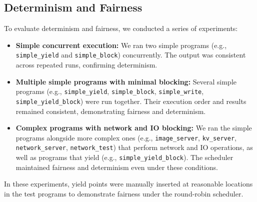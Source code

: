 \documentclass[10pt,a4paper,twocolumn]{IEEEtran}
\begin{document}
\subsection{Determinism and Fairness}
To evaluate determinism and fairness, we conducted a series of experiments:
\begin{itemize}
    \item \textbf{Simple concurrent execution:} We ran two simple programs (e.g., \texttt{simple\_yield} and \texttt{simple\_block}) concurrently. The output was consistent across repeated runs, confirming determinism.
    \item \textbf{Multiple simple programs with minimal blocking:} Several simple programs (e.g., \texttt{simple\_yield}, \texttt{simple\_block}, \texttt{simple\_write}, \texttt{simple\_yield\_block}) were run together. Their execution order and results remained consistent, demonstrating fairness and determinism.
    \item \textbf{Complex programs with network and IO blocking:} We ran the simple programs alongside more complex ones (e.g., \texttt{image\_server}, \texttt{kv\_server}, \texttt{network\_server}, \texttt{network\_test}) that perform network and IO operations, as well as programs that yield (e.g., \texttt{simple\_yield\_block}). The scheduler maintained fairness and determinism even under these conditions.
\end{itemize}
In these experiments, yield points were manually inserted at reasonable locations in the test programs to demonstrate fairness under the round-robin scheduler.
\end{document}

